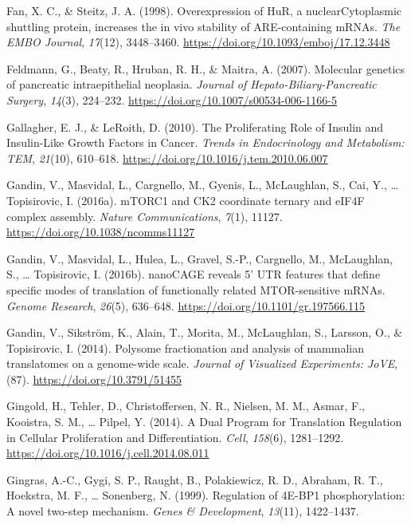 \documentclass[12pt,openany]{book}
\begin{document}
\hypertarget{ref-Fan1998}{}
Fan, X. C., \& Steitz, J. A. (1998). Overexpression of HuR, a
nuclearCytoplasmic shuttling protein, increases the in vivo stability of
ARE-containing mRNAs. \emph{The EMBO Journal}, \emph{17}(12),
3448--3460. \url{https://doi.org/10.1093/emboj/17.12.3448}

\hypertarget{ref-Feldmann2007}{}
Feldmann, G., Beaty, R., Hruban, R. H., \& Maitra, A. (2007). Molecular
genetics of pancreatic intraepithelial neoplasia. \emph{Journal of
Hepato-Biliary-Pancreatic Surgery}, \emph{14}(3), 224--232.
\url{https://doi.org/10.1007/s00534-006-1166-5}

\hypertarget{ref-Gallagher2010}{}
Gallagher, E. J., \& LeRoith, D. (2010). The Proliferating Role of
Insulin and Insulin-Like Growth Factors in Cancer. \emph{Trends in
Endocrinology and Metabolism: TEM}, \emph{21}(10), 610--618.
\url{https://doi.org/10.1016/j.tem.2010.06.007}

\hypertarget{ref-Gandin2016}{}
Gandin, V., Masvidal, L., Cargnello, M., Gyenis, L., McLaughlan, S.,
Cai, Y., \ldots{} Topisirovic, I. (2016a). mTORC1 and CK2 coordinate
ternary and eIF4F complex assembly. \emph{Nature Communications},
\emph{7}(1), 11127. \url{https://doi.org/10.1038/ncomms11127}

\hypertarget{ref-Gandin2016a}{}
Gandin, V., Masvidal, L., Hulea, L., Gravel, S.-P., Cargnello, M.,
McLaughlan, S., \ldots{} Topisirovic, I. (2016b). nanoCAGE reveals 5'
UTR features that define specific modes of translation of functionally
related MTOR-sensitive mRNAs. \emph{Genome Research}, \emph{26}(5),
636--648. \url{https://doi.org/10.1101/gr.197566.115}

\hypertarget{ref-Gandin2014}{}
Gandin, V., Sikström, K., Alain, T., Morita, M., McLaughlan, S.,
Larsson, O., \& Topisirovic, I. (2014). Polysome fractionation and
analysis of mammalian translatomes on a genome-wide scale. \emph{Journal
of Visualized Experiments: JoVE}, (87).
\url{https://doi.org/10.3791/51455}

\hypertarget{ref-Gingold2014}{}
Gingold, H., Tehler, D., Christoffersen, N. R., Nielsen, M. M., Asmar,
F., Kooistra, S. M., \ldots{} Pilpel, Y. (2014). A Dual Program for
Translation Regulation in Cellular Proliferation and Differentiation.
\emph{Cell}, \emph{158}(6), 1281--1292.
\url{https://doi.org/10.1016/j.cell.2014.08.011}

\hypertarget{ref-Gingras1999}{}
Gingras, A.-C., Gygi, S. P., Raught, B., Polakiewicz, R. D., Abraham, R.
T., Hoekstra, M. F., \ldots{} Sonenberg, N. (1999). Regulation of 4E-BP1
phosphorylation: A novel two-step mechanism. \emph{Genes \&
Development}, \emph{13}(11), 1422--1437.
\end{document}
